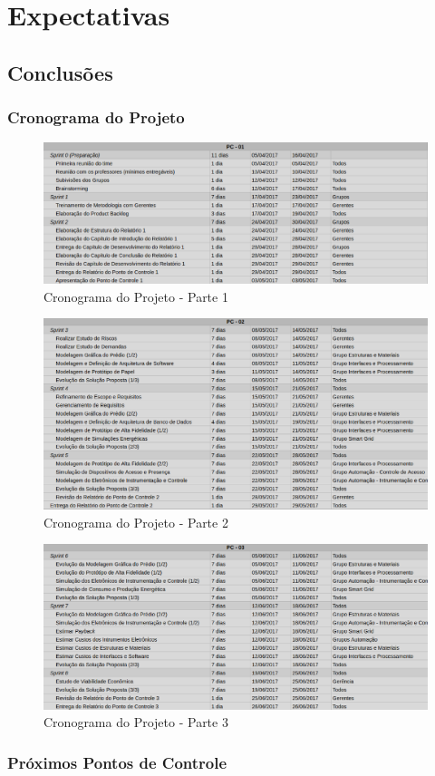 \part{Expectativas}
\chapter[Conclusões]{Conclusões}

\section{Cronograma do Projeto}

\begin{figure}[!h]
 \centering	\includegraphics[keepaspectratio=true,scale=0.45]{figuras/c1.eps}
 \caption{Cronograma do Projeto - Parte 1}
 \label{fig022}
\end{figure}
\pagebreak
\begin{figure}[!h]
 \centering	\includegraphics[keepaspectratio=true,scale=0.45]{figuras/c2.eps}
 \caption{Cronograma do Projeto - Parte 2}
 \label{fig022}
\end{figure}

\begin{figure}[!h]
 \centering	\includegraphics[keepaspectratio=true,scale=0.45]{figuras/c3.eps}
 \caption{Cronograma do Projeto - Parte 3}
 \label{fig022}
\end{figure}

\section{Próximos Pontos de Controle}
